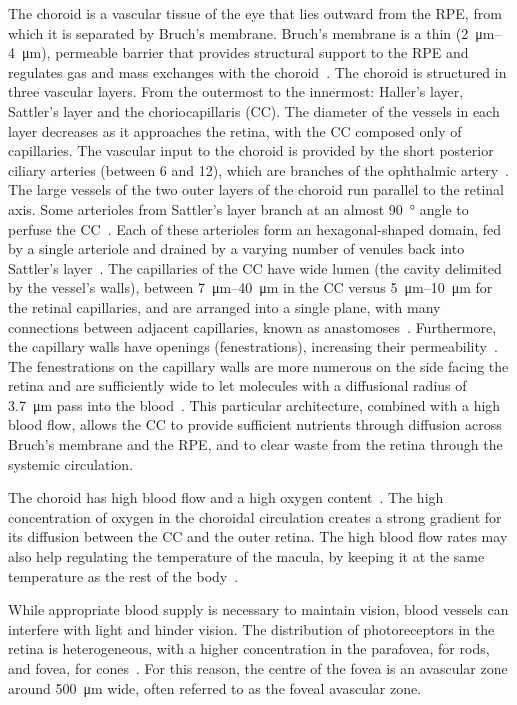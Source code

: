 \documentclass{article}
\begin{document}
The choroid is a vascular tissue of the eye that lies outward from the RPE, from which it is separated by Bruch's membrane.
Bruch's membrane is a thin (\SIrange{2}{4}{\micro\meter}), permeable barrier that provides structural support to the RPE and regulates gas and mass exchanges with the choroid~\cite{Curcio_2013}.
The choroid is structured in three vascular layers.
From the outermost to the innermost: Haller's layer, Sattler's layer and the choriocapillaris (CC).
The diameter of the vessels in each layer decreases as it approaches the retina, with the CC composed only of capillaries.
The vascular input to the choroid is provided by the short posterior ciliary arteries (between 6 and 12), which are branches of the ophthalmic artery~\cite{Kiel_2011}.
The large vessels of the two outer layers of the choroid run parallel to the retinal axis.
Some arterioles from Sattler's layer branch at an almost \SI{90}{\degree} angle to perfuse the CC~\cite{Nickla_2010}.
Each of these arterioles form an hexagonal-shaped domain, fed by a single arteriole and drained by a varying number of venules back into Sattler's layer~\cite{Zouache_2016}.
The capillaries of the CC have wide lumen (the cavity delimited by the vessel's walls), between \SIrange{7}{40}{\micro\meter} in the CC versus \SIrange{5}{10}{\micro\meter} for the retinal capillaries, and are arranged into a single plane, with many connections between adjacent capillaries, known as anastomoses~\cite{Bill_1983, ChanLing_2011,Fryczkowski_1994}.
Furthermore, the capillary walls have openings (fenestrations), increasing their permeability~\cite{Nickla_2010}.
The fenestrations on the capillary walls are more numerous on the side facing the retina and are sufficiently wide to let molecules with a diffusional radius of \SI{3.7}{\micro\meter} pass into the blood~\cite{Nickla_2010, Bill_1983}.
This particular architecture, combined with a high blood flow, allows the CC to provide sufficient nutrients through diffusion across Bruch's membrane and the RPE, and to clear waste from the retina through the systemic circulation.

The choroid has high blood flow and a high oxygen content~\cite{Bill_1983}.
The high concentration of oxygen in the choroidal circulation creates a strong gradient for its diffusion between the CC and the outer retina.
The high blood flow rates may also help regulating the temperature of the macula, by keeping it at the same temperature as the rest of the body~\cite{Bill_1983, Parver_1991}.

While appropriate blood supply is necessary to maintain vision, blood vessels can interfere with light and hinder vision.
The distribution of photoreceptors in the retina is heterogeneous, with a higher concentration in the parafovea, for rods, and fovea, for cones~\cite{Zouache_2022}.
For this reason, the centre of the fovea is an avascular zone around \SI{500}{\micro\meter} wide, often referred to as the foveal avascular zone.
\end{document}
